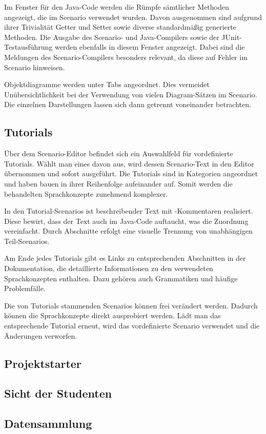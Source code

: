 Im Fenster für den Java-Code werden die Rümpfe sämtlicher Methoden angezeigt, die im Scenario verwendet wurden.
Davon ausgenommen sind aufgrund ihrer Trivialität Getter und Setter sowie diverse standardmäßig generierte Methoden.
Die Ausgabe des Scenario- und Java-Compilers sowie der JUnit-Testausführung werden ebenfalls in diesem Fenster angezeigt.
Dabei sind die Meldungen des Scenario-Compilers besonders relevant, da diese auf Fehler im Scenario hinweisen.

Objektdiagramme werden unter Tabs angeordnet.
Dies vermeidet Unübersichtlichkeit bei der Verwendung von vielen Diagram-Sätzen im Scenario.
Die einzelnen Darstellungen lassen sich dann getrennt voneinander betrachten.

\subsection{Tutorials}\label{subsec:tutorials}

Über dem Scenario-Editor befindet sich ein Auswahlfeld für vordefinierte Tutorials.
Wählt man eines davon aus, wird dessen Scenario-Text in den Editor übernommen und sofort ausgeführt.
Die Tutorials sind in Kategorien angeordnet und haben bauen in ihrer Reihenfolge aufeinander auf.
Somit werden die behandelten Sprachkonzepte zunehmend komplexer.

In den Tutorial-Scenarios ist beschreibender Text mit \code{//}-Kommentaren realisiert.
Diese bewirt, dass der Text auch im Java-Code auftaucht, was die Zuordnung vereinfacht.
Durch Abschnitte erfolgt eine visuelle Trennung von unabhängigen Teil-Scenarios.

Am Ende jedes Tutorials gibt es Links zu entsprechenden Abschnitten in der Dokumentation,
die detaillierte Informationen zu den verwendeten Sprachkonzepten enthalten.
Dazu gehören auch Grammatiken und häufige Problemfälle.

Die von Tutorials stammenden Scenarios können frei verändert werden.
Dadurch können die Sprachkonzepte direkt ausprobiert werden.
Lädt man das entsprechende Tutorial erneut, wird das vordefinierte Scenario verwendet und die Änderungen verworfen.

\subsection{Projektstarter}\label{subsec:project-starter}


\subsection{Sicht der Studenten}\label{subsec:students-view}


\subsection{Datensammlung}\label{subsec:data-collection}

